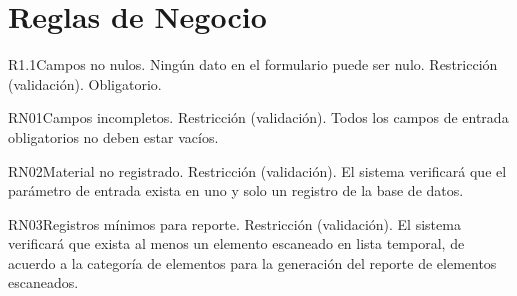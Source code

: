 
\section{Reglas de Negocio}

\begin{BussinesRule}{R1.1}{Campos no nulos.} 
	\BRitem[Descripción:] Ningún dato en el formulario puede ser nulo.
	\BRitem[Tipo:] Restricción (validación).
	\BRitem[Nivel:] Obligatorio.
\end{BussinesRule}


\begin{BussinesRule}{RN01}{Campos incompletos.} 
	\BRitem[Tipo:] Restricción (validación).
	\BRitem[Descripción:] Todos los campos de entrada obligatorios no deben estar vacíos.
\end{BussinesRule}

\begin{BussinesRule}{RN02}{Material no registrado.} 
	\BRitem[Tipo:] Restricción (validación).
	\BRitem[Descripción:] El sistema verificará que el parámetro de entrada exista en uno y solo un registro de la base de datos.
\end{BussinesRule}

\begin{BussinesRule}{RN03}{Registros mínimos para reporte.} 
	\BRitem[Tipo:] Restricción (validación).
	\BRitem[Descripción:] El sistema verificará que exista al menos un elemento escaneado en lista temporal, de acuerdo a la categoría de elementos para la generación del reporte de elementos escaneados.
\end{BussinesRule}

